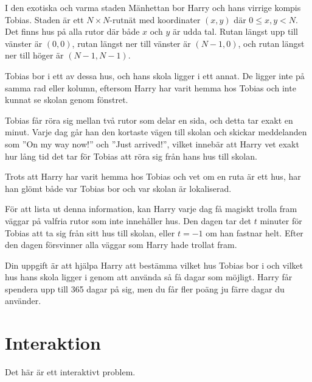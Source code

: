 
I den exotiska och varma staden Mänhettan bor Harry och hans virrige kompis Tobias. 
Staden är ett $N \times N$-rutnät med koordinater $(x,y)$ där $0 \le x,y < N$. Det finns hus på alla rutor där både $x$ och $y$ är udda tal. 
Rutan längst upp till vänster är $(0,0)$, rutan längst ner till vänster är $(N-1,0)$, och rutan längst ner till höger är $(N-1,N-1)$.

Tobias bor i ett av dessa hus, och hans skola ligger i ett annat. 
De ligger inte på samma rad eller kolumn, eftersom Harry har varit hemma hos Tobias och inte kunnat se skolan genom fönstret.

Tobias får röra sig mellan två rutor som delar en sida, och detta tar exakt en minut. Varje dag går han den kortaste vägen till skolan och skickar meddelanden som ''On my way now!'' och ''Just arrived!'', 
vilket innebär att Harry vet exakt hur lång tid det tar för Tobias att röra sig från hans hus till skolan. 

Trots att Harry har varit hemma hos Tobias och vet om en ruta är ett hus, har han glömt både var Tobias bor och var skolan är lokaliserad.

För att lista ut denna information, kan Harry varje dag få magiskt trolla fram väggar på valfria rutor som inte innehåller hus. 
Den dagen tar det $t$ minuter för Tobias att ta sig från sitt hus till skolan, eller $t = -1$ om han fastnar helt. Efter den dagen försvinner alla väggar som Harry hade trollat fram.

Din uppgift är att hjälpa Harry att bestämma vilket hus Tobias bor i och vilket hus hans skola ligger i genom att använda så få dagar som möjligt. 
Harry får spendera upp till 365 dagar på sig, men du får fler poäng ju färre dagar du använder.

\section*{Interaktion}
Det här är ett interaktivt problem.

